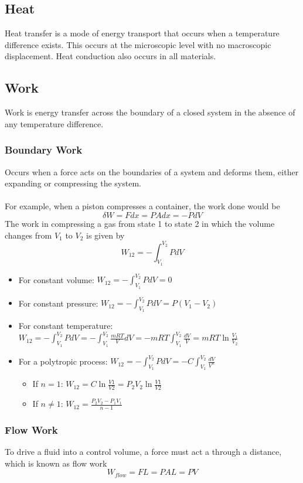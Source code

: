 \documentclass[11pt]{article}
\begin{document}
\subsection{Heat}
Heat transfer is a mode of energy transport that occurs when a temperature difference exists. This occurs at the microscopic level with no macroscopic displacement. Heat conduction also occurs in all materials.
\subsection{Work}
Work is energy transfer across the boundary of a closed system in the absence of any temperature difference. 
\subsubsection{Boundary Work}
Occurs when a force acts on the boundaries of a system and deforms them, either expanding or compressing the system.
\\ \\
For example, when a piston compresses a container, the work done would be
$$ \delta W = Fdx = PAdx = -PdV$$
The work in compressing a gas from state 1 to state 2 in which the volume changes from $V_1$ to $V_2$ is given by $$ W_{12} = - \int_{V_1}^{V_2}PdV$$
\begin{itemize}
\item For constant volume: $ W_{12} = - \int_{V_1}^{V_2}PdV = 0$
\item For constant pressure: $ W_{12} = - \int_{V_1}^{V_2}PdV = P(V_1 - V_2)$
\item For constant temperature: $ W_{12} = - \int_{V_1}^{V_2}PdV = -\int_{V_1}^{V_2}\frac{mRT}{V} dV = -mRT\int_{V_1}^{V_2}\frac{dV}{V}= mRT \ln{\frac{V_1}{V_2}}$
\item For a polytropic process: $ W_{12} = - \int_{V_1}^{V_2}PdV = -C\int_{V_1}^{V_2} \frac{dV}{V^n}$
\begin{itemize}
\item If $n = 1$: $ W_{12} = C\ln{\frac{V1}{V2}}= P_{2} V_{2}\ln{\frac{V1}{V2}} $
\item If $n \neq 1$: $W_{12} = \frac{P_2V_2 - P_1V_1}{n-1} $
\end{itemize}
\end{itemize}
\subsubsection{Flow Work}
To drive a fluid into a control volume, a force must act a through a distance, which is known as flow work
$$ W_{flow} = FL = PAL = PV$$
\end{document}
